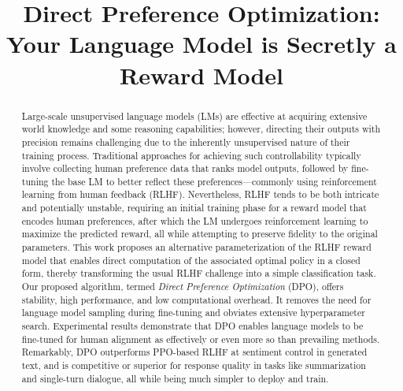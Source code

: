 \title{Direct Preference Optimization: Your Language Model is Secretly a Reward Model}

\begin{abstract}
Large-scale unsupervised language models (LMs) are effective at acquiring extensive world knowledge and some reasoning capabilities; however, directing their outputs with precision remains challenging due to the inherently unsupervised nature of their training process. Traditional approaches for achieving such controllability typically involve collecting human preference data that ranks model outputs, followed by fine-tuning the base LM to better reflect these preferences—commonly using reinforcement learning from human feedback (RLHF). Nevertheless, RLHF tends to be both intricate and potentially unstable, requiring an initial training phase for a reward model that encodes human preferences, after which the LM undergoes reinforcement learning to maximize the predicted reward, all while attempting to preserve fidelity to the original parameters. This work proposes an alternative parameterization of the RLHF reward model that enables direct computation of the associated optimal policy in a closed form, thereby transforming the usual RLHF challenge into a simple classification task. Our proposed algorithm, termed \textit{Direct Preference Optimization} (DPO), offers stability, high performance, and low computational overhead. It removes the need for language model sampling during fine-tuning and obviates extensive hyperparameter search. Experimental results demonstrate that DPO enables language models to be fine-tuned for human alignment as effectively or even more so than prevailing methods. Remarkably, DPO outperforms PPO-based RLHF at sentiment control in generated text, and is competitive or superior for response quality in tasks like summarization and single-turn dialogue, all while being much simpler to deploy and train.
\end{abstract}

